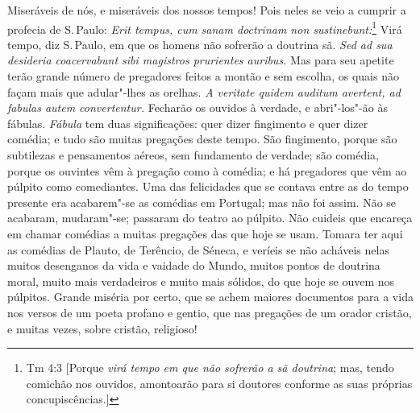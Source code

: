 Miseráveis de nós, e miseráveis dos nossos tempos! Pois neles se veio
a cumprir a profecia de S.\,Paulo: \emph{Erit tempus, cum sanam doctrinam
non sustinebunt:}\footnote{Tm 4:3 [Porque \emph{virá tempo em que não sofrerão a sã doutrina}; mas, tendo comichão nos ouvidos, amontoarão para si doutores conforme as suas próprias concupiscências.]} Virá tempo, diz S.\,Paulo, em que os homens não
sofrerão a doutrina sã. \emph{Sed ad sua desideria coacervabunt sibi
magistros prurientes auribus.} Mas para seu apetite terão grande
número de pregadores feitos a montão e sem escolha, os quais não façam
mais que adular"-lhes as orelhas. \emph{A veritate quidem auditum
avertent, ad fabulas autem convertentur.} Fecharão os ouvidos à
verdade, e abri"-los"-ão às fábulas. \emph{Fábula} tem duas
significações: quer dizer fingimento e quer dizer comédia; e tudo são
muitas pregações deste tempo. São fingimento, porque são subtilezas e
pensamentos aéreos, sem fundamento de verdade; são comédia, porque os
ouvintes vêm à pregação como à comédia; e há pregadores que vêm ao
púlpito como comediantes. Uma das felicidades que se contava entre as do
tempo presente era acabarem"-se as comédias em Portugal; mas não foi
assim. Não se acabaram, mudaram"-se; passaram do teatro ao púlpito. Não
cuideis que encareça em chamar comédias a muitas pregações das que
hoje se usam. Tomara ter aqui as comédias de Plauto, de Terêncio, de
Séneca, e veríeis se não acháveis nelas muitos desenganos da vida e
vaidade do Mundo, muitos pontos de doutrina moral, muito mais
verdadeiros e muito mais sólidos, do que hoje
se ouvem nos púlpitos. Grande miséria por certo, que se achem maiores
documentos para a vida nos versos de um poeta profano e gentio, que nas
pregações de um orador cristão, e muitas vezes, sobre cristão,
religioso!

